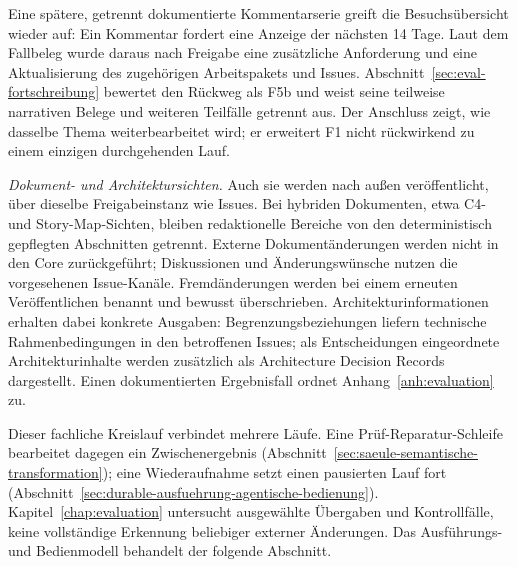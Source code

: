 Eine spätere, getrennt dokumentierte Kommentarserie greift die
Besuchsübersicht wieder auf: Ein Kommentar fordert eine Anzeige der
nächsten 14 Tage. Laut dem Fallbeleg wurde daraus nach Freigabe eine
zusätzliche Anforderung und eine Aktualisierung des zugehörigen
Arbeitspakets und Issues. Abschnitt~\ref{sec:eval-fortschreibung}
bewertet den Rückweg als F5b und weist seine teilweise narrativen
Belege und weiteren Teilfälle getrennt aus. Der Anschluss zeigt,
wie dasselbe Thema weiterbearbeitet wird; er erweitert F1 nicht
rückwirkend zu einem einzigen durchgehenden Lauf.

\emph{Dokument- und Architektursichten.} Auch sie werden nach außen
veröffentlicht, über dieselbe Freigabeinstanz wie Issues. Bei
hybriden Dokumenten, etwa C4- und Story-Map-Sichten, bleiben
redaktionelle Bereiche von den deterministisch gepflegten
Abschnitten getrennt. Externe Dokumentänderungen werden nicht in
den Core zurückgeführt; Diskussionen und Änderungswünsche nutzen
die vorgesehenen Issue-Kanäle. Fremdänderungen werden bei einem
erneuten Veröffentlichen benannt und bewusst überschrieben.
Architekturinformationen erhalten dabei konkrete Ausgaben:
Begrenzungsbeziehungen liefern technische Rahmenbedingungen in
den betroffenen Issues; als Entscheidungen eingeordnete
Architekturinhalte werden zusätzlich als Architecture Decision
Records dargestellt. Einen dokumentierten Ergebnisfall ordnet
Anhang~\ref{anh:evaluation} zu.

Dieser fachliche Kreislauf verbindet mehrere Läufe. Eine
Prüf-Reparatur-Schleife bearbeitet dagegen ein Zwischenergebnis
(Abschnitt~\ref{sec:saeule-semantische-transformation}); eine
Wiederaufnahme setzt einen pausierten Lauf fort
(Abschnitt~\ref{sec:durable-ausfuehrung-agentische-bedienung}).
Kapitel~\ref{chap:evaluation} untersucht ausgewählte Übergaben und
Kontrollfälle, keine vollständige Erkennung beliebiger externer
Änderungen. Das Ausführungs- und Bedienmodell behandelt der
folgende Abschnitt.
